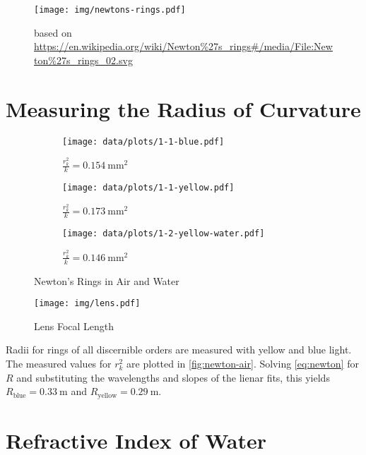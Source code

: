 \begin{figure}[tbp]
	\centering
	\texttt{[image: img/newtons-rings.pdf]}
	\caption{Newton's Rings}
	\label{fig:newton}
	\caption*{based on \url{https://en.wikipedia.org/wiki/Newton\%27s_rings\#/media/File:Newton\%27s_rings_02.svg}}
\end{figure}

\section{Measuring the Radius of Curvature}\label{sec:radius}

\begin{figure}[tbp]
	\centering
	\begin{subfigure}{.32\textwidth}
		\centering
		\texttt{[image: data/plots/1-1-blue.pdf]}
		\caption{Blue LED (\SI{465}{\nm})}
		\caption*{$\frac{r_k^2}{k} = \SI{0.154}{\mm\squared}$}
	\end{subfigure}
	\begin{subfigure}{.32\textwidth}
		\centering
		\texttt{[image: data/plots/1-1-yellow.pdf]}
		\caption{Yellow LED (\SI{590}{\nm})}
		\caption*{$\frac{r_k^2}{k} = \SI{0.173}{\mm\squared}$}
	\end{subfigure}
	\begin{subfigure}{.32\textwidth}
		\centering
		\texttt{[image: data/plots/1-2-yellow-water.pdf]}
		\caption{Yellow LED (\SI{590}{\nm}) in Water}
		\caption*{$\frac{r_k^2}{k} = \SI{0.146}{\mm\squared}$}
	\end{subfigure}
	\caption{Newton's Rings in Air and Water}
	\label{fig:newton-air}
\end{figure}

\begin{figure}[tbp]
	\centering
	\texttt{[image: img/lens.pdf]}
	\caption{Lens Focal Length}
	\label{fig:lens}
\end{figure}

Radii for rings of all discernible orders are measured with yellow and blue light.
The measured values for $r_k^2$ are plotted in \autoref{fig:newton-air}.
Solving \autoref{eq:newton} for $R$ and substituting the wavelengths and slopes of the lienar fits, this yields $R_\text{blue} = \SI{0.33}{\meter}$ and $R_\text{yellow} = \SI{0.29}{\meter}$.

\section{Refractive Index of Water}


